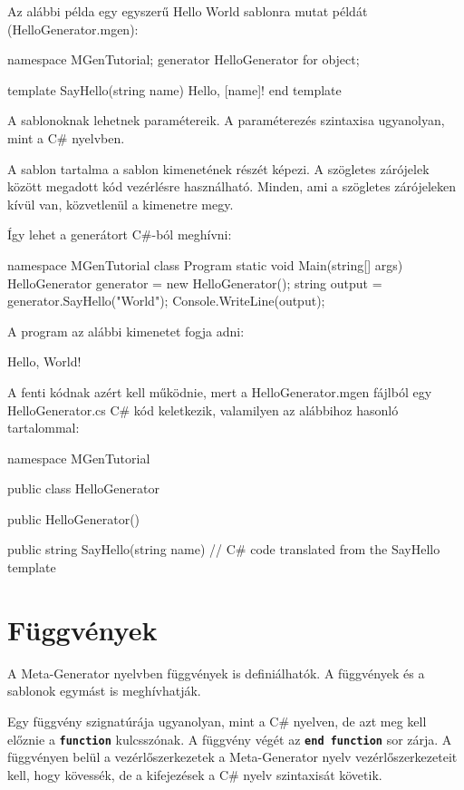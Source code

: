\documentclass[12pt, a4paper]{report}
\newcommand{\ff}[1]{\textbf{\texttt{#1}}}
\begin{document}
Az alábbi példa egy egyszerű Hello World sablonra mutat példát (HelloGenerator.mgen):

\begin{mgencode}
namespace MGenTutorial;
generator HelloGenerator for object;

template SayHello(string name)
Hello, [name]!
end template
\end{mgencode}

A sablonoknak lehetnek paramétereik. A paraméterezés szintaxisa ugyanolyan, mint a C\# nyelvben.

A sablon tartalma a sablon kimenetének részét képezi. A szögletes zárójelek között megadott kód vezérlésre használható. Minden, ami a szögletes zárójeleken kívül van, közvetlenül a kimenetre megy.

Így lehet a generátort C\#-ból meghívni:

\begin{csharpcode}
namespace MGenTutorial
{
	class Program
	{
		static void Main(string[] args)
		{
			HelloGenerator generator = new HelloGenerator();
			string output = generator.SayHello("World");
			Console.WriteLine(output);
		}
	}
}
\end{csharpcode}

A program az alábbi kimenetet fogja adni:

\begin{textcode}
Hello, World!
\end{textcode}

A fenti kódnak azért kell működnie, mert a HelloGenerator.mgen fájlból egy HelloGenerator.cs C\# kód keletkezik, valamilyen az alábbihoz hasonló tartalommal:

\begin{csharpcode}
namespace MGenTutorial
{
	public class HelloGenerator
	{
		public HelloGenerator()
		{
		}
		
		public string SayHello(string name)
		{
			// C# code translated from the SayHello template
		}
	}
}
\end{csharpcode}

\section{Függvények}

A Meta-Generator nyelvben függvények is definiálhatók. A függvények és a sablonok egymást is meghívhatják.

Egy függvény szignatúrája ugyanolyan, mint a C\# nyelven, de azt meg kell előznie a \ff{function} kulcsszónak. A függvény végét az \ff{end function} sor zárja. A függvényen belül a vezérlőszerkezetek a Meta-Generator nyelv vezérlőszerkezeteit kell, hogy kövessék, de a kifejezések a C\# nyelv szintaxisát követik.
\end{document}
